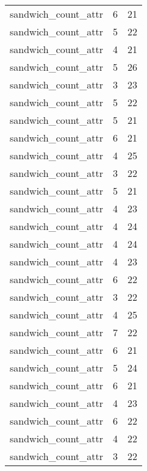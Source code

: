 \begin{table}
\begin{tabular}{lrr}
             sandwich\_count\_attr &         6 &        21 \\
             sandwich\_count\_attr &         5 &        22 \\
             sandwich\_count\_attr &         4 &        21 \\
             sandwich\_count\_attr &         5 &        26 \\
             sandwich\_count\_attr &         3 &        23 \\
             sandwich\_count\_attr &         5 &        22 \\
             sandwich\_count\_attr &         5 &        21 \\
             sandwich\_count\_attr &         6 &        21 \\
             sandwich\_count\_attr &         4 &        25 \\
             sandwich\_count\_attr &         3 &        22 \\
             sandwich\_count\_attr &         5 &        21 \\
             sandwich\_count\_attr &         4 &        23 \\
             sandwich\_count\_attr &         4 &        24 \\
             sandwich\_count\_attr &         4 &        24 \\
             sandwich\_count\_attr &         4 &        23 \\
             sandwich\_count\_attr &         6 &        22 \\
             sandwich\_count\_attr &         3 &        22 \\
             sandwich\_count\_attr &         4 &        25 \\
             sandwich\_count\_attr &         7 &        22 \\
             sandwich\_count\_attr &         6 &        21 \\
             sandwich\_count\_attr &         5 &        24 \\
             sandwich\_count\_attr &         6 &        21 \\
             sandwich\_count\_attr &         4 &        23 \\
             sandwich\_count\_attr &         6 &        22 \\
             sandwich\_count\_attr &         4 &        22 \\
             sandwich\_count\_attr &         3 &        22 \\

\end{tabular}
\end{table}
